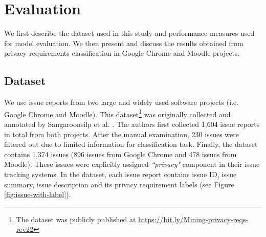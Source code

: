 \section{Evaluation} \label{sec:evaluation}

We first describe the dataset used in this study and performance measures used for model evaluation. We then present and discuss the results obtained from privacy requirements classification in Google Chrome and Moodle projects. 

\subsection{Dataset} \label{subsec:dataset}

We use issue reports from two large and widely used software projects (i.e. Google Chrome and Moodle). This dataset\footnote{The dataset was publicly published at \url{https://bit.ly/Mining-privacy-reqs-rev22}} was originally collected and annotated by Sangaroonsilp et al. \cite{Sangaroonsilp2023}. The authors first collected 1,604 issue reports in total from both projects. After the manual examination, 230 issues were filtered out due to limited information for classification task. Finally, the dataset contains 1,374 issues (896 issues from Google Chrome and 478 issues from Moodle). These issues were explicitly assigned \textit{``privacy"} component in their issue tracking systems. In the dataset, each issue report contains issue ID, issue summary, issue description and its privacy requirement labels (see Figure \ref{fig:issue-with-label}). 

